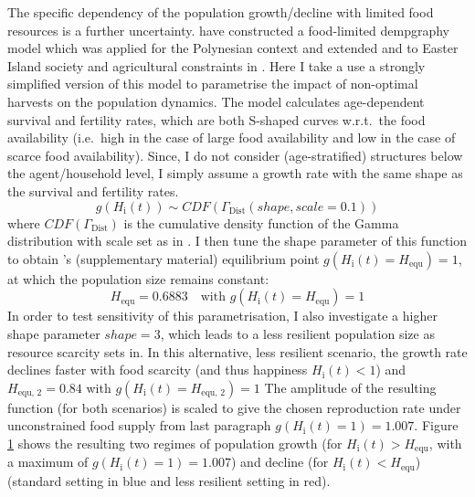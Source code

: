 The specific dependency of the population growth/decline with limited food resources is a further uncertainty.
\citet{Lee2008} have constructed a food-limited dempgraphy model which was applied for the Polynesian context \citet{Puleston2008} and extended and to Easter Island society and agricultural constraints in \citet{Puleston2017}. 
Here I take a use a strongly simplified version of this model to parametrise the impact of non-optimal harvests on the population dynamics. 
The model calculates age-dependent survival and fertility rates, which are both S-shaped curves w.r.t.\ the food availability (i.e.\ high in the case of large food availability and low in the case of scarce food availability).
Since, I do not consider (age-stratified) structures below the agent/household level, I simply assume a growth rate with the same shape as the survival and fertility rates.
\begin{equation}
g(H_\text{i}(t)) \sim CDF(\Gamma_\text{Dist}(shape, scale=0.1))
\end{equation}
where $CDF(\Gamma_\text{Dist})$ is the cumulative density function of the Gamma distribution with scale set as in \citet{Lee2008}.
I then tune the shape parameter of this function to obtain \citet{Puleston2017}'s (supplementary material)  equilibrium point $g(H_\text{i}(t) =H_\text{equ})=1$, at which the population size remains constant:
\begin{equation}
H_\text{equ}=0.6883 \quad \text{with } g(H_\text{i}(t) = H_\text{equ})=1  
\end{equation} 
In order to test sensitivity of this parametrisation, I also investigate a higher shape parameter $shape=3$\TODO, which leads to a less resilient population size as resource scarcity sets in.
In this alternative, less resilient scenario, the growth rate declines faster with food scarcity (and thus happiness $H_\text{i}(t)<1$) and $H_\text{equ, 2}=0.84$ with $g(H_\text{i}(t)=H_\text{equ, 2})=1$
The amplitude of the resulting function (for both scenarios) is scaled to give the chosen reproduction rate under unconstrained food supply from last paragraph 
$g(H_\text{i}(t)=1)=1.007$.
Figure \ref{fig:growthrate} shows the resulting two regimes of population growth (for $H_\text{i}(t)>H_\text{equ}$, with a maximum of $g(H_\text{i}(t)=1)=1.007$) and decline (for $H_\text{i}(t)<H_\text{equ}$) (standard setting in blue and less resilient setting in red).
\begin{figure}
	\centering
	\caption{}
	\label{fig:growthrate}
\end{figure}

